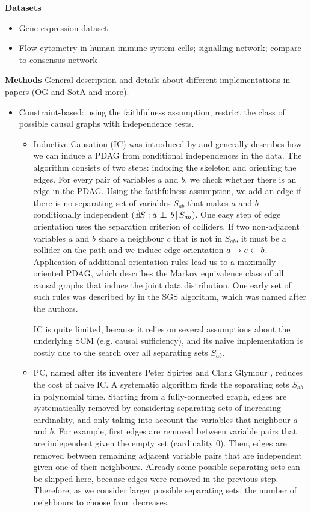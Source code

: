 \textbf{Datasets}
\begin{itemize}
    \item [\cite{kemmeren2014large}]
        Gene expression dataset.
    \item [\cite{sachs2005causal}] 
        Flow cytometry in human immune system cells; signalling network; compare to consensus network
\end{itemize}

\textbf{Methods}
General description and details about different implementations in papers (OG and SotA and more).
\begin{itemize}
    \item Constraint-based: using the faithfulness assumption, restrict the class of possible causal graphs with independence tests.
        \begin{itemize}
            \item Inductive Causation (IC) was introduced by \citet{verma1991equivalence} and generally describes how we can induce a PDAG from conditional independences in the data. The algorithm consists of two steps: inducing the skeleton and orienting the edges. For every pair of variables $a$ and $b$, we check whether there is an edge in the PDAG. Using the faithfulness assumption, we add an edge if there is no separating set of variables $S_{ab}$ that makes $a$ and $b$ conditionally independent ($\nexists S : {a} \operatorname*{{\,\perp\mkern-12mu\perp\,}}_{} {b} \,|\, {S_{ab}}$). One easy step of edge orientation uses the separation criterion of colliders. If two non-adjacent variables $a$ and $b$ share a neighbour $c$ that is not in $S_{ab}$, it must be a collider on the path and we induce edge orientation $a\to c \leftarrow b$. Application of additional orientation rules lead us to a maximally oriented PDAG, which describes the Markov equivalence class of all causal graphs that induce the joint data distribution. One early set of such rules was described by \citet{spirtes2000causation} in the SGS algorithm, which was named after the authors.
            
            IC is quite limited, because it relies on several assumptions about the underlying SCM (e.g. causal sufficiency), and its naive implementation is costly due to the search over all separating sets $S_{ab}$.

            \item PC, named after its inventers Peter Spirtes and Clark Glymour \citep{spirtes1991algorithm}, reduces the cost of naive IC. A systematic algorithm finds the separating sets $S_{ab}$ in polynomial time. Starting from a fully-connected graph, edges are systematically removed by considering separating sets of increasing cardinality, and only taking into account the variables that neighbour $a$ and $b$. For example, first edges are removed between variable pairs that are independent given the empty set (cardinality 0). Then, edges are removed between remaining adjacent variable pairs that are independent given one of their neighbours. Already some possible separating sets can be skipped here, because edges were removed in the previous step. Therefore, as we consider larger possible separating sets, the number of neighbours to choose from decreases.
            

\end{itemize}
\end{itemize}
